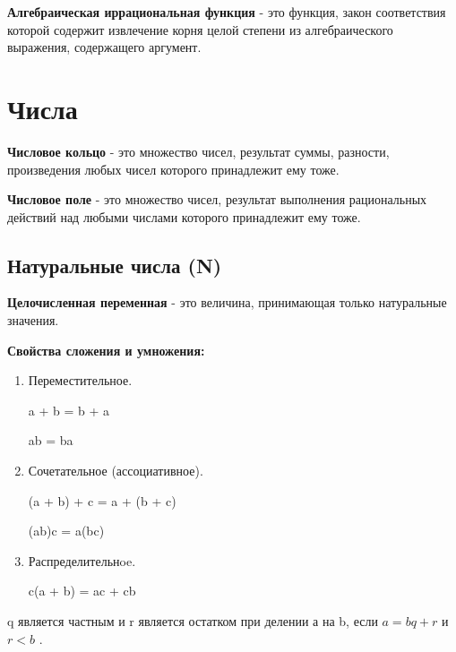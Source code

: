 \documentclass[oneside]{book}
\begin{document}
	\textbf{Алгебраическая иррациональная функция} - это
	функция, закон соответствия которой содержит
	извлечение корня целой степени из алгебраического выражения,
	содержащего аргумент.

	\chapter{Числа}
	\textbf{Числовое кольцо} - это множество чисел,
	результат суммы, разности, произведения любых чисел которого
	принадлежит ему тоже.

	\textbf{Числовое поле} - это множество чисел,
	результат выполнения рациональных действий над любыми
	числами которого принадлежит ему тоже.

	\section{Натуральные числа (N)}
	\textbf{Целочисленная переменная} - это
	величина, принимающая только
	натуральные значения.

	\textbf{Свойства сложения и умножения:}
	\begin{enumerate}
		\item Переместительное.
		\begin{flalign*}
			a + b = b + a
		\end{flalign*}
		\begin{flalign*}
			ab = ba
		\end{flalign*}

		\item Сочетательное (ассоциативное).
		\begin{flalign*}
			(a + b) + c = a + (b + c)
		\end{flalign*}
		\begin{flalign*}
			(ab)c = a(bc)
		\end{flalign*}

		\item Распределительнoe.
		\begin{flalign*}
			c(a + b) = ac + cb
		\end{flalign*}
	\end{enumerate}

	q является частным и r является остатком при делении а на b,
	если
	\begin{math}
		a = bq + r
	\end{math}
	и
	\begin{math}
		r < b
	\end{math}
	.
\end{document}
